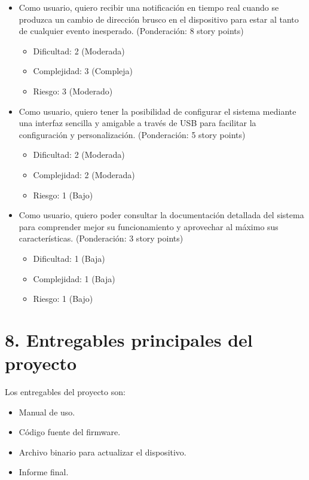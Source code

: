 \documentclass[
11pt, %
codirector, %
]{charter}
\begin{document}
\begin{itemize}
    
    \item Como usuario, quiero recibir una notificación en tiempo real cuando se produzca un cambio de dirección brusco en el dispositivo para estar al tanto de cualquier evento inesperado. (Ponderación: 8 story points)
    \begin{itemize}
        \item Dificultad: 2 (Moderada)
        \item Complejidad: 3 (Compleja)
        \item Riesgo: 3 (Moderado)
    \end{itemize}  
    
    \item Como usuario, quiero tener la posibilidad de configurar el sistema mediante una interfaz sencilla y amigable a través de USB para facilitar la configuración y personalización. (Ponderación: 5 story points)
    \begin{itemize}
        \item Dificultad: 2 (Moderada)
        \item Complejidad: 2 (Moderada)
        \item Riesgo: 1 (Bajo)
    \end{itemize}  
    
    \item Como usuario, quiero poder consultar la documentación detallada del sistema para comprender mejor su funcionamiento y aprovechar al máximo sus características. (Ponderación: 3 story points)
    \begin{itemize}
        \item Dificultad: 1 (Baja)
        \item Complejidad: 1 (Baja)
        \item Riesgo: 1 (Bajo)
    \end{itemize}  
\end{itemize}


\section{8. Entregables principales del proyecto}
\label{sec:entregables}

Los entregables del proyecto son:
\begin{itemize}
    \item Manual de uso.
    \item Código fuente del firmware.
    \item Archivo binario para actualizar el dispositivo.
    \item Informe final.
\end{itemize}
\end{document}
